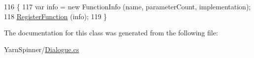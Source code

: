 \begin{DoxyCode}
116                                                                                                \{
117             var info = \textcolor{keyword}{new} FunctionInfo (name, parameterCount, implementation);
118             \hyperlink{a00049_a001ab29d21fe7db10fc9c250914287f9}{RegisterFunction} (info);
119         \}
\end{DoxyCode}


The documentation for this class was generated from the following file\-:\begin{DoxyCompactItemize}
\item 
Yarn\-Spinner/\hyperlink{a00117}{Dialogue.\-cs}\end{DoxyCompactItemize}
